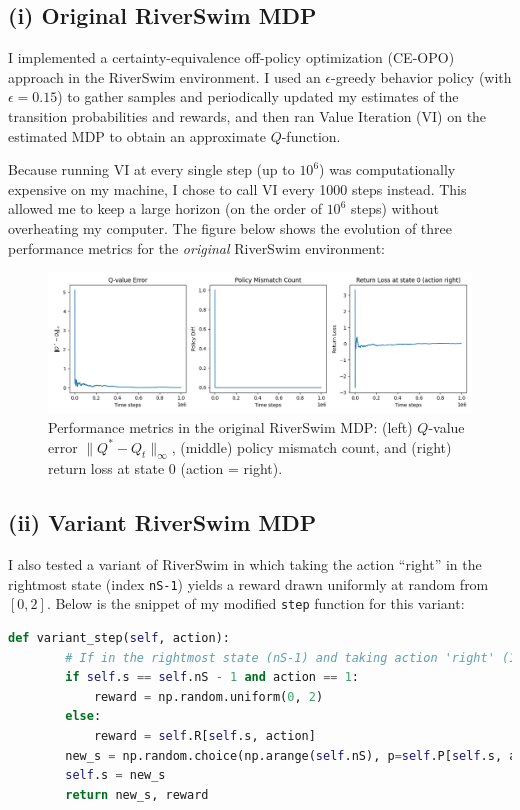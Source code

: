 \subsection*{(i) Original RiverSwim MDP}
I implemented a certainty-equivalence off-policy optimization (CE-OPO) approach in the RiverSwim environment. 
I used an $\epsilon$-greedy behavior policy (with $\epsilon=0.15$) to gather samples and periodically updated 
my estimates of the transition probabilities and rewards, and then ran Value Iteration (VI) on the estimated MDP 
to obtain an approximate $Q$-function. 

Because running VI at every single step (up to $10^6$) was computationally expensive on my machine, I chose to 
call VI every 1000 steps instead. This allowed me to keep a large horizon (on the order of $10^6$ steps) without 
overheating my computer. The figure below shows the evolution of three performance metrics for the \emph{original} 
RiverSwim environment:

\begin{figure}[H]
    \centering
    \includegraphics[width=1\textwidth]{Code/RiverSwim_CE-OPO.png}
    \caption{Performance metrics in the original RiverSwim MDP: (left) $Q$-value error $\|Q^* - Q_t\|_\infty$, 
    (middle) policy mismatch count, and (right) return loss at state 0 (action = right).}
    \label{fig:original}
\end{figure}

\subsection*{(ii) Variant RiverSwim MDP}
I also tested a variant of RiverSwim in which taking the action ``right'' in the rightmost state 
(index \texttt{nS-1}) yields a reward drawn uniformly at random from $[0,2]$. Below is the snippet of my modified 
\texttt{step} function for this variant:

\begin{lstlisting}[language=Python, caption={Definition of the variant\_step function.}, basicstyle=\ttfamily\small]
    def variant_step(self, action):
        # If in the rightmost state (nS-1) and taking action 'right' (1):
        if self.s == self.nS - 1 and action == 1:
            reward = np.random.uniform(0, 2)
        else:
            reward = self.R[self.s, action]
        new_s = np.random.choice(np.arange(self.nS), p=self.P[self.s, action])
        self.s = new_s
        return new_s, reward
\end{lstlisting}

